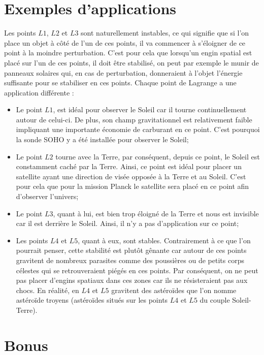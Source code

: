 \documentclass[12pt]{article}
\begin{document}
\section{Exemples d'applications}
Les points $L1$, $L2$ et $L3$ sont naturellement instables, ce qui signifie que si l'on place un objet à côté de l'un de ces points, il va commencer à s'éloigner de ce point à la moindre perturbation. C'est pour cela que lorsqu'un engin spatial est placé sur l'un de ces points, il doit être stabilisé, on peut par exemple le munir de panneaux solaires qui, en cas de perturbation, donneraient à l'objet l'énergie suffisante pour se stabiliser en ces points. 
Chaque point de Lagrange a une application différente : \\
\begin{itemize}
\item Le point $L1$, est idéal pour observer le Soleil car il tourne continuellement autour de celui-ci. De plus, son champ gravitationnel est relativement faible impliquant une importante économie de carburant en ce point. C'est pourquoi la sonde SOHO y a été installée pour observer le Soleil; \\
\item Le point $L2$ tourne avec la Terre, par conséquent, depuis ce point, le Soleil est constamment caché par la Terre. Ainsi, ce point est idéal pour placer un satellite ayant une direction de visée opposée à la Terre et au Soleil. C'est pour cela que pour la mission Planck le satellite sera placé en ce point afin d'observer l'univers; \\
\item Le point $L3$, quant à lui, est bien trop éloigné de la Terre et nous est invisible car il est derrière le Soleil. Ainsi, il n'y a pas d'application sur ce point; \\
\item Les points $L4$ et $L5$, quant à eux, sont stables. Contrairement à ce que l'on pourrait penser, cette stabilité est plutôt gênante car autour de ces points gravitent de nombreux parasites comme des poussières ou de petits corps célestes qui se retrouveraient piégés en ces points. Par conséquent, on ne peut pas placer d'engins spatiaux dans ces zones car ils ne résisteraient pas aux chocs. 
En réalité, en $L4$ et $L5$ gravitent des astéroïdes que l'on nomme astéroïde troyens (astéroïdes situés sur les points $L4$ et $L5$ du couple Soleil-Terre).
\end{itemize}
\section{Bonus}
\end{document}
